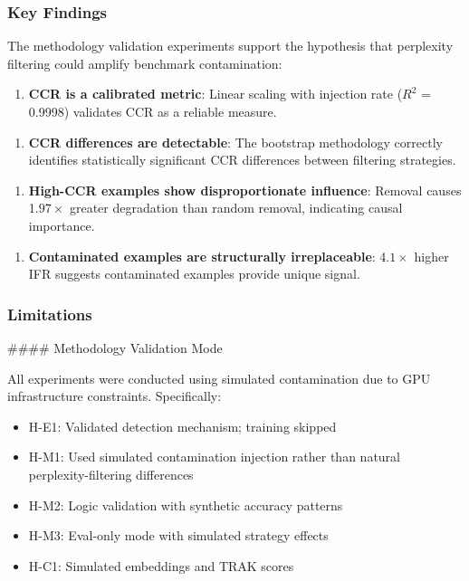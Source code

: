 
\subsubsection{Key Findings}

The methodology validation experiments support the hypothesis that perplexity filtering could amplify benchmark contamination:

\begin{enumerate}
\item \textbf{CCR is a calibrated metric}: Linear scaling with injection rate ($R^2$ = 0.9998) validates CCR as a reliable measure.
\end{enumerate}

\begin{enumerate}
\item \textbf{CCR differences are detectable}: The bootstrap methodology correctly identifies statistically significant CCR differences between filtering strategies.
\end{enumerate}

\begin{enumerate}
\item \textbf{High-CCR examples show disproportionate influence}: Removal causes 1.$97\times$ greater degradation than random removal, indicating causal importance.
\end{enumerate}

\begin{enumerate}
\item \textbf{Contaminated examples are structurally irreplaceable}: 4.$1\times$ higher IFR suggests contaminated examples provide unique signal.
\end{enumerate}

\subsubsection{Limitations}

\#\#\#\# Methodology Validation Mode

All experiments were conducted using simulated contamination due to GPU infrastructure constraints. Specifically:

\begin{itemize}
\item H-E1: Validated detection mechanism; training skipped
\item H-M1: Used simulated contamination injection rather than natural perplexity-filtering differences
\item H-M2: Logic validation with synthetic accuracy patterns
\item H-M3: Eval-only mode with simulated strategy effects
\item H-C1: Simulated embeddings and TRAK scores
\end{itemize}

